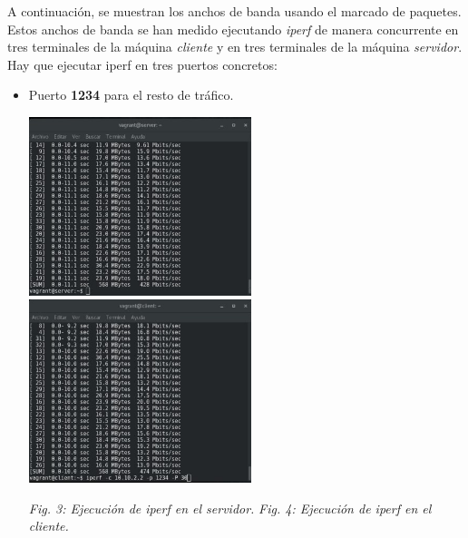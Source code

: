 \documentclass[11pt]{article}
\begin{document}
A continuación, se muestran los anchos de banda usando el marcado de paquetes. Estos anchos de banda se han medido ejecutando \textit{iperf} de manera concurrente en tres terminales de la máquina \textit{cliente} y en tres terminales de la máquina \textit{servidor}. Hay que ejecutar iperf en tres puertos concretos:

\begin{itemize}
\item Puerto \textbf{1234} para el resto de tráfico.
\begin{center}
\includegraphics[width=6.5cm]{puerto1234Server.jpg}
\hspace{0.5cm}
\includegraphics[width=6.5cm]{puerto1234Client.jpg}
\end{center}

\begin{center}
\textit{Fig. 3: Ejecución de \textit{iperf} en el \textit{servidor}.}
\hspace{0.5cm}
\textit{Fig. 4: Ejecución de \textit{iperf} en el \textit{cliente}.}
\end{center}



\end{itemize}
\end{document}
